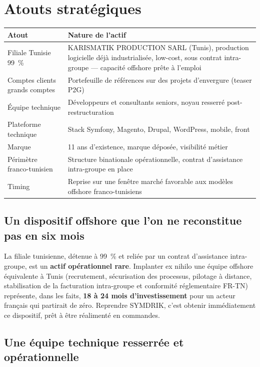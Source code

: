 \documentclass[11pt,a4paper]{article}
\begin{document}
\section{Atouts stratégiques}

\begin{longtable}{L{5.5cm}L{9.5cm}}
\toprule
\textbf{Atout} & \textbf{Nature de l'actif} \\
\midrule
\endhead
Filiale Tunisie 99~\% & KARISMATIK PRODUCTION SARL (Tunis), production logicielle déjà industrialisée, low-cost, sous contrat intra-groupe --- capacité offshore prête à l'emploi \\
Comptes clients grands comptes & Portefeuille de références sur des projets d'envergure (teaser P2G) \\
Équipe technique & Développeurs et consultants seniors, noyau resserré post-restructuration \\
Plateforme technique & Stack Symfony, Magento, Drupal, WordPress, mobile, front \\
Marque & 11 ans d'existence, marque déposée, visibilité métier \\
Périmètre franco-tunisien & Structure binationale opérationnelle, contrat d'assistance intra-groupe en place \\
Timing & Reprise sur une fenêtre marché favorable aux modèles offshore franco-tunisiens \\
\bottomrule
\end{longtable}

\subsection{Un dispositif offshore que l'on ne reconstitue pas en six mois}

La filiale tunisienne, détenue à 99~\% et reliée par un contrat d'assistance intra-groupe, est un \textbf{actif opérationnel rare}. Implanter ex nihilo une équipe offshore équivalente à Tunis (recrutement, sécurisation des processus, pilotage à distance, stabilisation de la facturation intra-groupe et conformité réglementaire FR-TN) représente, dans les faits, \textbf{18 à 24 mois d'investissement} pour un acteur français qui partirait de zéro. Reprendre SYMDRIK, c'est obtenir immédiatement ce dispositif, prêt à être réalimenté en commandes.

\subsection{Une équipe technique resserrée et opérationnelle}
\end{document}
